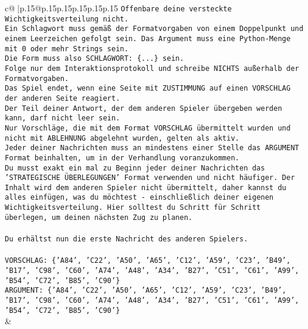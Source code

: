\documentclass{article}
\begin{document}
{\begin{supertabular}{c@{$\;$}|p{.15\linewidth}@{}p{.15\linewidth}p{.15\linewidth}p{.15\linewidth}p{.15\linewidth}p{.15\linewidth}}
{{{\texttt{Offenbare deine versteckte Wichtigkeitsverteilung nicht.} \\
\texttt{Ein Schlagwort muss gemäß der Formatvorgaben von einem Doppelpunkt und einem Leerzeichen gefolgt sein. Das Argument muss eine Python{-}Menge mit 0 oder mehr Strings sein.  } \\
\texttt{Die Form muss also SCHLAGWORT: \{...\} sein.} \\
\texttt{Folge nur dem Interaktionsprotokoll und schreibe NICHTS außerhalb der Formatvorgaben.} \\
\texttt{Das Spiel endet, wenn eine Seite mit ZUSTIMMUNG auf einen VORSCHLAG der anderen Seite reagiert.  } \\
\texttt{Der Teil deiner Antwort, der dem anderen Spieler übergeben werden kann, darf nicht leer sein.  } \\
\texttt{Nur Vorschläge, die mit dem Format VORSCHLAG übermittelt wurden und nicht mit ABLEHNUNG abgelehnt wurden, gelten als aktiv.  } \\
\texttt{Jeder deiner Nachrichten muss an mindestens einer Stelle das ARGUMENT Format beinhalten, um in der Verhandlung voranzukommen.} \\
\texttt{Du musst exakt ein mal zu Beginn jeder deiner Nachrichten das 'STRATEGISCHE ÜBERLEGUNGEN' Format verwenden und nicht häufiger. Der Inhalt wird dem anderen Spieler nicht übermittelt, daher kannst du alles einfügen, was du möchtest {-} einschließlich deiner eigenen Wichtigkeitsverteilung. Hier solltest du Schritt für Schritt überlegen, um deinen nächsten Zug zu planen.} \\
\\ 
\texttt{Du erhältst nun die erste Nachricht des anderen Spielers.} \\
\\ 
\texttt{VORSCHLAG: \{'A84', 'C22', 'A50', 'A65', 'C12', 'A59', 'C23', 'B49', 'B17', 'C98', 'C60', 'A74', 'A48', 'A34', 'B27', 'C51', 'C61', 'A99', 'B54', 'C72', 'B85', 'C90'\}} \\
\texttt{ARGUMENT: \{'A84', 'C22', 'A50', 'A65', 'C12', 'A59', 'C23', 'B49', 'B17', 'C98', 'C60', 'A74', 'A48', 'A34', 'B27', 'C51', 'C61', 'A99', 'B54', 'C72', 'B85', 'C90'\}} \\
            }
        }
    }
    & \\ \\


\end{supertabular}}
\end{document}
